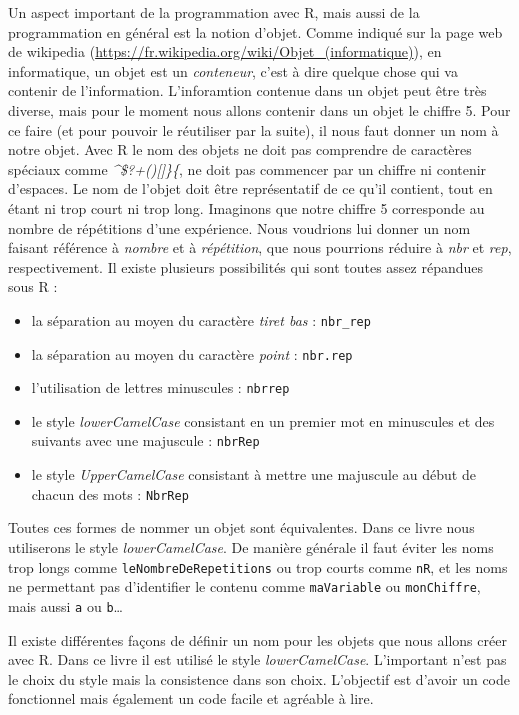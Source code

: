 \documentclass[]{book}
\makeatletter
\providecommand{\tightlist}{%
  \setlength{\itemsep}{0pt}\setlength{\parskip}{0pt}}
\newenvironment{kframe}{%
\medskip{}
\setlength{\fboxsep}{.8em}
 \def\at@end@of@kframe{}%
 \ifinner\ifhmode%
  \def\at@end@of@kframe{\end{minipage}}%
  \begin{minipage}{\columnwidth}%
 \fi\fi%
 \def\FrameCommand##1{\hskip\@totalleftmargin \hskip-\fboxsep
 \colorbox{shadecolor}{##1}\hskip-\fboxsep
     \hskip-\linewidth \hskip-\@totalleftmargin \hskip\columnwidth}%
 \MakeFramed {\advance\hsize-\width
   \@totalleftmargin\z@ \linewidth\hsize
   \@setminipage}}%
 {\par\unskip\endMakeFramed%
 \at@end@of@kframe}
\newenvironment{rmdblock}[1]
  {
  \begin{itemize}
  \renewcommand{\labelitemi}{
    \raisebox{-.7\height}[0pt][0pt]{
      {\setkeys{Gin}{width=3em,keepaspectratio}\texttt{[image: myIcons/\#1]}} %
    }
  }
  \setlength{\fboxsep}{1em}
  \begin{kframe}
  \item
  }
  {
  \end{kframe}
  \end{itemize}
  }
\newenvironment{rmdstyle}     %
  {\begin{rmdblock}{style}}   %
  {\end{rmdblock}}            %
\makeatother
\begin{document}
Un aspect important de la programmation avec R, mais aussi de la
programmation en général est la notion d'objet. Comme indiqué sur la
page web de wikipedia
(\url{https://fr.wikipedia.org/wiki/Objet_(informatique)}), en
informatique, un objet est un \emph{conteneur}, c'est à dire quelque
chose qui va contenir de l'information. L'inforamtion contenue dans un
objet peut être très diverse, mais pour le moment nous allons contenir
dans un objet le chiffre 5. Pour ce faire (et pour pouvoir le réutiliser
par la suite), il nous faut donner un nom à notre objet. Avec R le nom
des objets ne doit pas comprendre de caractères spéciaux comme
\emph{\^{}\$?\textbar{}+(){[}{]}\}\{}, ne doit pas commencer par un
chiffre ni contenir d'espaces. Le nom de l'objet doit être représentatif
de ce qu'il contient, tout en étant ni trop court ni trop long.
Imaginons que notre chiffre 5 corresponde au nombre de répétitions d'une
expérience. Nous voudrions lui donner un nom faisant référence à
\emph{nombre} et à \emph{répétition}, que nous pourrions réduire à
\emph{nbr} et \emph{rep}, respectivement. Il existe plusieurs
possibilités qui sont toutes assez répandues sous R :

\begin{itemize}
\tightlist
\item
  la séparation au moyen du caractère \emph{tiret bas} :
  \texttt{nbr\_rep}
\item
  la séparation au moyen du caractère \emph{point} : \texttt{nbr.rep}
\item
  l'utilisation de lettres minuscules : \texttt{nbrrep}
\item
  le style \emph{lowerCamelCase} consistant en un premier mot en
  minuscules et des suivants avec une majuscule : \texttt{nbrRep}
\item
  le style \emph{UpperCamelCase} consistant à mettre une majuscule au
  début de chacun des mots : \texttt{NbrRep}
\end{itemize}

Toutes ces formes de nommer un objet sont équivalentes. Dans ce livre
nous utiliserons le style \emph{lowerCamelCase}. De manière générale il
faut éviter les noms trop longs comme \texttt{leNombreDeRepetitions} ou
trop courts comme \texttt{nR}, et les noms ne permettant pas
d'identifier le contenu comme \texttt{maVariable} ou
\texttt{monChiffre}, mais aussi \texttt{a} ou \texttt{b}\ldots{}

\begin{rmdstyle}
Il existe différentes façons de définir un nom pour les objets que nous
allons créer avec R. Dans ce livre il est utilisé le style
\emph{lowerCamelCase}. L'important n'est pas le choix du style mais la
consistence dans son choix. L'objectif est d'avoir un code fonctionnel
mais également un code facile et agréable à lire.
\end{rmdstyle}
\end{document}
